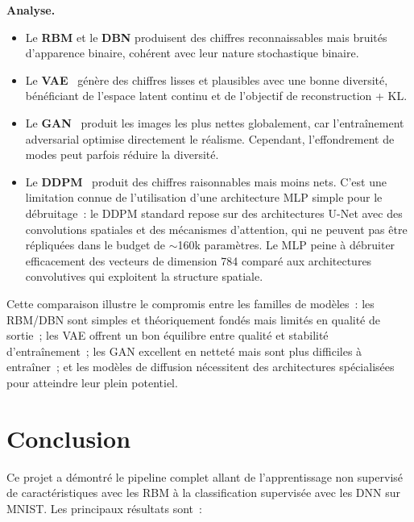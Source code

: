 \documentclass[11pt,a4paper]{article}
\begin{document}
\textbf{Analyse.}
\begin{itemize}
    \item Le \textbf{RBM} et le \textbf{DBN} produisent des chiffres reconnaissables mais bruit\'es d'apparence binaire, coh\'erent avec leur nature stochastique binaire.
    \item Le \textbf{VAE}~\cite{kingma2014} g\'en\`ere des chiffres lisses et plausibles avec une bonne diversit\'e, b\'en\'eficiant de l'espace latent continu et de l'objectif de reconstruction + KL.
    \item Le \textbf{GAN}~\cite{goodfellow2014} produit les images les plus nettes globalement, car l'entra\^inement adversarial optimise directement le r\'ealisme. Cependant, l'effondrement de modes peut parfois r\'eduire la diversit\'e.
    \item Le \textbf{DDPM}~\cite{ho2020} produit des chiffres raisonnables mais moins nets. C'est une limitation connue de l'utilisation d'une architecture MLP simple pour le d\'ebruitage~: le DDPM standard repose sur des architectures U-Net avec des convolutions spatiales et des m\'ecanismes d'attention, qui ne peuvent pas \^etre r\'epliqu\'ees dans le budget de $\sim$160k param\`etres. Le MLP peine \`a d\'ebruiter efficacement des vecteurs de dimension 784 compar\'e aux architectures convolutives qui exploitent la structure spatiale.
\end{itemize}

Cette comparaison illustre le compromis entre les familles de mod\`eles~: les RBM/DBN sont simples et th\'eoriquement fond\'es mais limit\'es en qualit\'e de sortie~; les VAE offrent un bon \'equilibre entre qualit\'e et stabilit\'e d'entra\^inement~; les GAN excellent en nettet\'e mais sont plus difficiles \`a entra\^iner~; et les mod\`eles de diffusion n\'ecessitent des architectures sp\'ecialis\'ees pour atteindre leur plein potentiel.

\section{Conclusion}

Ce projet a d\'emontr\'e le pipeline complet allant de l'apprentissage non supervis\'e de caract\'eristiques avec les RBM \`a la classification supervis\'ee avec les DNN sur MNIST. Les principaux r\'esultats sont~:
\end{document}
